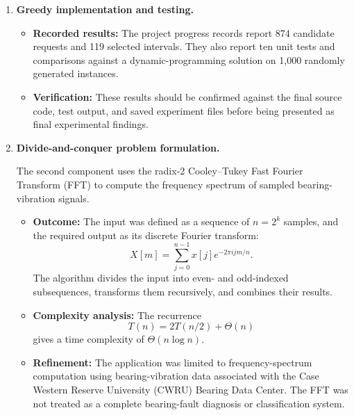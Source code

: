 \documentclass[conference]{IEEEtran}
\begin{document}
\begin{enumerate}
\begin{itemize}
    \item \textbf{Refinement:}
    The model was restricted to a single resource and equal-value
    intervals. It does not claim to solve the complete operational
    DSN scheduling problem or account for all its operational
    constraints.
\end{itemize}

\item \textbf{Greedy implementation and testing.}

\begin{itemize}
    \item \textbf{Recorded results:}
    The project progress records report 874 candidate requests and
    119 selected intervals. They also report ten unit tests and
    comparisons against a dynamic-programming solution on 1,000
    randomly generated instances.

    \item \textbf{Verification:}
    These results should be confirmed against the final source code,
    test output, and saved experiment files before being presented
    as final experimental findings.
\end{itemize}

\item \textbf{Divide-and-conquer problem formulation.}

The second component uses the radix-2 Cooley--Tukey Fast Fourier
Transform (FFT) to compute the frequency spectrum of sampled
bearing-vibration signals.

\begin{itemize}
    \item \textbf{Outcome:}
    The input was defined as a sequence of \(n=2^k\) samples, and
    the required output as its discrete Fourier transform:
    \[
        X[m]=\sum_{j=0}^{n-1}x[j]e^{-2\pi i jm/n}.
    \]
    The algorithm divides the input into even- and odd-indexed
    subsequences, transforms them recursively, and combines their
    results.

    \item \textbf{Complexity analysis:}
    The recurrence
    \[
        T(n)=2T(n/2)+\Theta(n)
    \]
    gives a time complexity of \(\Theta(n\log n)\).

    \item \textbf{Refinement:}
    The application was limited to frequency-spectrum computation
    using bearing-vibration data associated with the Case Western
    Reserve University (CWRU) Bearing Data Center. The FFT was not
    treated as a complete bearing-fault diagnosis or classification
    system.
\end{itemize}


\end{enumerate}
\end{document}
